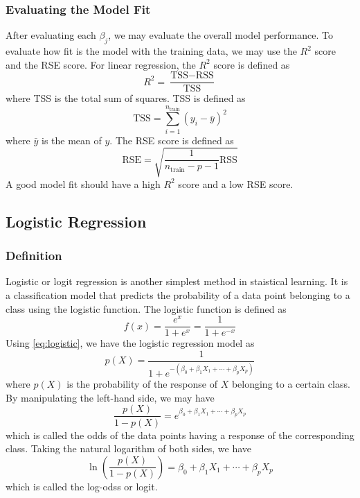 \documentclass[conf]{new-aiaa}
\begin{document}
\subsubsection{Evaluating the Model Fit}
After evaluating each $\beta_j$, we may evaluate the overall model performance. To evaluate how fit is the model with the training data, we may use the $R^2$ score and the RSE score. For linear regression, the $R^2$ score is defined as
\begin{equation} \label{eq:rsq}
    R^2 = \frac{\textrm{TSS} - \textrm{RSS}}{\textrm{TSS}}
\end{equation}
where TSS is the total sum of squares. TSS is defined as
\begin{equation} \label{eq:tss}
    \textrm{TSS} = \sum_{i=1}^{n_{\textrm{train}}} \left(y_i - \bar{y}\right)^2
\end{equation}
where $\bar{y}$ is the mean of $y$. The RSE score is defined as
\begin{equation} \label{eq:rse}
    \textrm{RSE} = \sqrt{\frac{1}{n_{\textrm{train}}-p-1}\textrm{RSS}}
\end{equation}
A good model fit should have a high $R^2$ score and a low RSE score.

\subsection{Logistic Regression}
\subsubsection{Definition}
Logistic or logit regression is another simplest method in staistical learning. It is a classification model that predicts the probability of a data point belonging to a class using the logistic function. The logistic function is defined as
\begin{equation} \label{eq:logistic}
    f(x) = \frac{e^x}{1 + e^x} = \frac{1}{1 + e^{-x}}
\end{equation}
Using \eqref{eq:logistic}, we have the logistic regression model as
\begin{equation} \label{eq:logreg}
    p\left(X\right) = \frac{1}{1 + e^{-\left(\beta_0 + \beta_1 X_1 + \cdots + \beta_p X_p\right)}}
\end{equation}
where $p\left(X\right)$ is the probability of the response of $X$ belonging to a certain class. By manipulating the left-hand side, we may have
\begin{equation} \label{eq:logregmanip}
    \frac{p\left(X\right)}{1 - p\left(X\right)} = e^{\beta_0 + \beta_1 X_1 + \cdots + \beta_p X_p}
\end{equation}
which is called the odds of the data points having a response of the corresponding class. Taking the natural logarithm of both sides, we have
\begin{equation} \label{eq:logreglog}
    \ln\left(\frac{p\left(X\right)}{1 - p\left(X\right)}\right) = \beta_0 + \beta_1 X_1 + \cdots + \beta_p X_p
\end{equation}
which is called the log-odss or logit.
\end{document}
